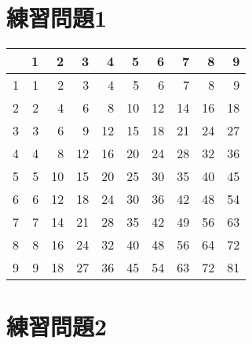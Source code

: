 \documentclass[titlepage]{jarticle}
\title{}
\author{平田 蓮}
\date{2020年月日}
\begin{document}
\maketitle

\section{練習問題1}
  \begin{tabular}[t]{r|rrrrrrrrr}
      & 1 & 2 & 3 & 4 & 5 & 6 & 7 & 8 & 9 \\ \hline
    1 & 1 & 2 & 3 & 4 & 5 & 6 & 7 & 8 & 9 \\
    2 & 2 & 4 & 6 & 8 & 10 & 12 & 14 & 16 & 18 \\
    3 & 3 & 6 & 9 & 12 & 15 & 18 & 21 & 24 & 27 \\
    4 & 4 & 8 & 12 & 16 & 20 & 24 & 28 & 32 & 36 \\
    5 & 5 & 10 & 15 & 20 & 25 & 30 & 35 & 40 & 45 \\
    6 & 6 & 12 & 18 & 24 & 30 & 36 & 42 & 48 & 54 \\
    7 & 7 & 14 & 21 & 28 & 35 & 42 & 49 & 56 & 63 \\
    8 & 8 & 16 & 24 & 32 & 40 & 48 & 56 & 64 & 72 \\
    9 & 9 & 18 & 27 & 36 & 45 & 54 & 63 & 72 & 81 \\
  \end{tabular}

\section{練習問題2}
  
\end{document}
